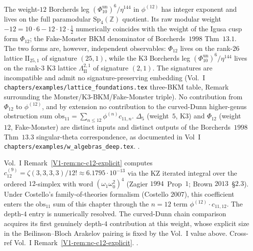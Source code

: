 \begin{remark}
\label{rem:cdhg-fake-monster-non-interference}
The weight-$12$ Borcherds leg
$(\Phi_{10}^{\mathrm{un}})^{6}/\eta^{144}$ in
$\phi^{(12)}$ has integer exponent and lives on the full paramodular
$\mathrm{Sp}_4(\mathbb Z)$ quotient. Its raw modular weight
$-12 = 10\cdot 6 - 12\cdot 12\cdot \tfrac{1}{2}$ numerically coincides
with the weight of the Igusa cusp form $\Phi_{12}$; the Fake-Monster
BKM denominator of Borcherds~$1998$ Thm~$13.1$. The two forms are,
however, independent observables: $\Phi_{12}$ lives on the rank-$26$
lattice $\mathrm{II}_{25, 1}$ of signature $(25, 1)$, while the K$3$
Borcherds leg
$(\Phi_{10}^{\mathrm{un}})^{6}/\eta^{144}$ lives on the rank-$3$ K$3$
lattice $\Lambda^{2, 1}_{\mathrm{II}}$ of signature $(2, 1)$. The
signatures are incompatible and admit no signature-preserving embedding
(Vol.~I \texttt{chapters/examples/lattice\_foundations.tex} three-BKM
table, Remark surrounding the Monster/K$3$-BKM/Fake-Monster triple).
No contribution from $\Phi_{12}$ to $\phi^{(12)}$, and by extension no
contribution to the curved-Dunn higher-genus obstruction sum
$\mathrm{obs}_{11} = \sum_{n\le 12}\phi^{(n)}c_{11, n}$. $\Delta_5$ (weight~$5$, K$3$) and $\Phi_{12}$ (weight~$12$, Fake-Monster)
are distinct inputs and distinct outputs of the Borcherds~$1998$ Thm~$13.3$
singular-theta correspondence, as documented in Vol~I
\texttt{chapters/examples/w\_algebras\_deep.tex}.
\cite{Borcherds1998,GritsenkoNikulin1998}.
\end{remark}

\begin{remark}
\label{rem:cdhg-c12-explicit}
Vol.~I Remark~\ref{V1-rem:nc-c12-explicit} computes
$c_{12}^{(9)} = \zeta(3, 3, 3, 3)/12! \approx 6.1795\cdot 10^{-13}$
via the KZ iterated integral over the ordered $12$-simplex with word
$(\omega_1\omega_0^2)^4$ (Zagier $1994$~Prop~$1$; Brown $2013$~\S $2.3$).
Under Costello's family-of-theories formalism (Costello $2007$),
this coefficient enters the $\mathrm{obs}_{11}$ sum of this chapter
through the $n = 12$ term $\phi^{(12)}\cdot c_{11, 12}$. The
depth-$4$ entry is numerically resolved. The curved-Dunn chain
comparison acquires its first genuinely depth-$4$ contribution at this
weight, whose explicit size in the
Beilinson--Bloch Arakelov pairing is fixed by the Vol.~I value above.
Cross-ref Vol.~I Remark~\ref{V1-rem:nc-c12-explicit}.
\cite{Zagier1994,Brown2011,Brown2013,Costello2007}.
\end{remark}
